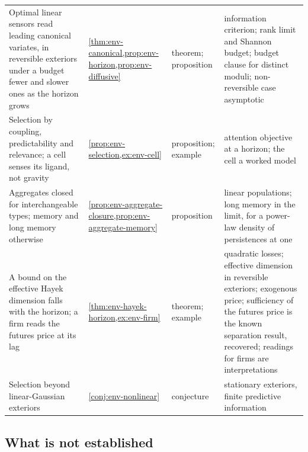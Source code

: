 \begin{longtable}{@{}>{\raggedright\arraybackslash}p{}>{\raggedright\arraybackslash}p{}>{\raggedright\arraybackslash}p{}>{\raggedright\arraybackslash}p{}@{}}
\addlinespace[2pt]
Optimal linear sensors read leading canonical variates, in reversible exteriors under a budget fewer and slower ones as the horizon grows & \cref{thm:env-canonical,prop:env-horizon,prop:env-diffusive} & theorem; proposition & information criterion; rank limit and Shannon budget; budget clause for distinct moduli; non-reversible case asymptotic\\
Selection by coupling, predictability and relevance; a cell senses its ligand, not gravity & \cref{prop:env-selection,ex:env-cell} & proposition; example & attention objective at a horizon; the cell a worked model\\
Aggregates closed for interchangeable types; memory and long memory otherwise & \cref{prop:env-aggregate-closure,prop:env-aggregate-memory} & proposition & linear populations; long memory in the limit, for a power-law density of persistences at one\\
A bound on the effective Hayek dimension falls with the horizon; a firm reads the futures price at its lag & \cref{thm:env-hayek-horizon,ex:env-firm} & theorem; example & quadratic losses; effective dimension in reversible exteriors; exogenous price; sufficiency of the futures price is the known separation result, recovered; readings for firms are interpretations\\
Selection beyond linear-Gaussian exteriors & \cref{conj:env-nonlinear} & conjecture & stationary exteriors, finite predictive information\\
\end{longtable}
\endgroup

\subsection{What is not established}\label{sec:int-open}

